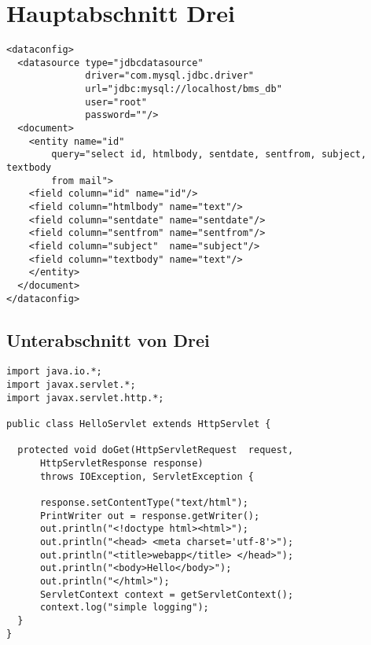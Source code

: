 \section{Hauptabschnitt Drei}\label{hauptabschnitt3}
\Blindtext

\lstset{language=xml}
\begin{lstlisting}[float=ht!, frame=htrbl, caption={die datei {\normalfont \ttfamily  data-config.xml} dient als beispiel für xml quellcode}, label={lst:dataconfigxml}]
<dataconfig>
  <datasource type="jdbcdatasource" 
              driver="com.mysql.jdbc.driver"
              url="jdbc:mysql://localhost/bms_db"
              user="root" 
              password=""/>
  <document>
    <entity name="id"
        query="select id, htmlbody, sentdate, sentfrom, subject, textbody
        from mail">
    <field column="id" name="id"/>
    <field column="htmlbody" name="text"/>
    <field column="sentdate" name="sentdate"/>
    <field column="sentfrom" name="sentfrom"/>
    <field column="subject"  name="subject"/>
    <field column="textbody" name="text"/>
    </entity>
  </document>
</dataconfig>
\end{lstlisting}
\Blindtext

\subsection{Unterabschnitt von Drei}\label{hauptabschnitt3.1}

\Blindtext

\lstset{language=java}
\begin{lstlisting}[float=ht!, frame=htrbl, caption={das listing zeigt java quellcode}, label={lst:result2}]
import java.io.*;
import javax.servlet.*;
import javax.servlet.http.*;

public class HelloServlet extends HttpServlet {

  protected void doGet(HttpServletRequest  request, 
      HttpServletResponse response)
      throws IOException, ServletException {

      response.setContentType("text/html");
      PrintWriter out = response.getWriter();
      out.println("<!doctype html><html>");
      out.println("<head> <meta charset='utf-8'>");
      out.println("<title>webapp</title> </head>");
      out.println("<body>Hello</body>");
      out.println("</html>");
      ServletContext context = getServletContext();
      context.log("simple logging");
  }
}
\end{lstlisting}
\Blindtext

